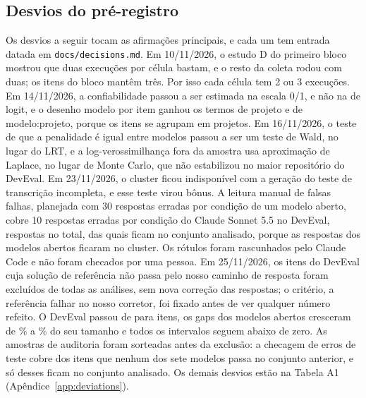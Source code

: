\subsection{Desvios do pré-registro}
\label{sec:desvios}
Os desvios a seguir tocam as afirmações principais, e cada um tem entrada datada em \texttt{docs/decisions.md}. Em 10/11/2026, o estudo D do primeiro bloco mostrou que duas execuções por célula bastam, e o resto da coleta rodou com duas; os itens do bloco mantêm três. Por isso cada célula tem 2 ou 3 execuções. Em 14/11/2026, a confiabilidade passou a ser estimada na escala 0/1, e não na de logit, e o desenho modelo por item ganhou os termos de projeto e de modelo:projeto, porque os itens se agrupam em projetos. Em 16/11/2026, o teste de que a penalidade é igual entre modelos passou a ser um teste de Wald, no lugar do LRT, e a log-verossimilhança fora da amostra usa aproximação de Laplace, no lugar de Monte Carlo, que não estabilizou no maior repositório do DevEval. Em 23/11/2026, o cluster ficou indisponível com a geração do teste de transcrição incompleta, e esse teste virou bônus. A leitura manual de falsas falhas, planejada com 30 respostas erradas por condição de um modelo aberto, cobre 10 respostas erradas por condição do Claude Sonnet 5.5 no DevEval, \handReadAnswers respostas no total, das quais \handReadKept ficam no conjunto analisado, porque as respostas dos modelos abertos ficaram no cluster. Os rótulos foram rascunhados pelo Claude Code e não foram checados por uma pessoa.
Em 25/11/2026, os \excludedDev itens do DevEval cuja solução de referência não passa pelo nosso caminho de resposta foram excluídos de todas as análises, sem nova correção das respostas; o critério, a referência falhar no nosso corretor, foi fixado antes de ver qualquer número refeito. O DevEval passou de \nItemsDevOriginal para \nItemsDev itens, os gaps dos modelos abertos cresceram de \gapGrowthLo{}\% a \gapGrowthHi{}\% do seu tamanho e todos os intervalos seguem abaixo de zero. As amostras de auditoria foram sorteadas antes da exclusão: a checagem de erros de teste cobre \neverPassedChecked dos \neverPassedAllSeven itens que nenhum dos sete modelos passa no conjunto anterior, e só \neverPassedAllSevenKept desses \neverPassedAllSeven ficam no conjunto analisado.
Os demais desvios estão na Tabela A1 (Apêndice~\ref{app:deviations}).
